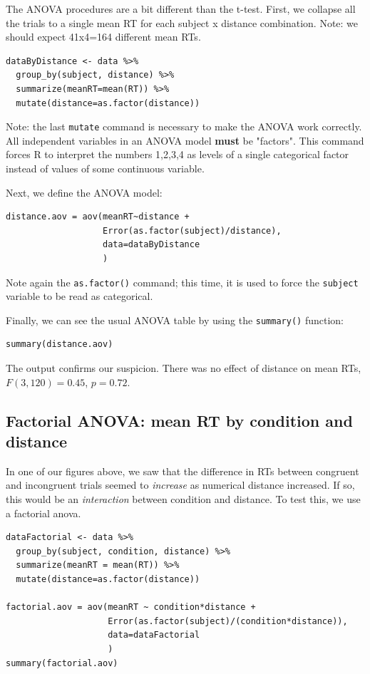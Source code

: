 \documentclass[11pt]{article}
\begin{document}
The ANOVA procedures are a bit different than the t-test.  First, we collapse all the trials to a single mean RT for each subject x distance combination.  Note: we should expect 41x4=164 different mean RTs.

\begin{verbatim}
dataByDistance <- data %>%
  group_by(subject, distance) %>%
  summarize(meanRT=mean(RT)) %>%
  mutate(distance=as.factor(distance))
\end{verbatim}

Note: the last \texttt{mutate} command is necessary to make the ANOVA work correctly.  All independent variables in an ANOVA model \textbf{must} be "factors".  This command forces R to interpret the numbers 1,2,3,4 as levels of a single categorical factor instead of values of some continuous variable.

Next, we define the ANOVA model:

\begin{verbatim}
distance.aov = aov(meanRT~distance + 
                   Error(as.factor(subject)/distance), 
                   data=dataByDistance
                   )
\end{verbatim}

Note again the \texttt{as.factor()} command; this time, it is used to force the \texttt{subject} variable to be read as categorical.  

Finally, we can see the usual ANOVA table by using the \texttt{summary()} function:

\begin{verbatim}
summary(distance.aov)
\end{verbatim}

The output confirms our suspicion.  There was no effect of distance on mean RTs, $F(3,120)=0.45$, $p=0.72$.

\subsection*{Factorial ANOVA: mean RT by condition and distance}
\label{sec-5-3}

In one of our figures above, we saw that the difference in RTs between congruent and incongruent trials seemed to \emph{increase} as numerical distance increased.  If so, this would be an \emph{interaction} between condition and distance.  To test this, we use a factorial anova.

\begin{verbatim}
dataFactorial <- data %>%
  group_by(subject, condition, distance) %>%
  summarize(meanRT = mean(RT)) %>%
  mutate(distance=as.factor(distance))

factorial.aov = aov(meanRT ~ condition*distance + 
                    Error(as.factor(subject)/(condition*distance)), 
                    data=dataFactorial
                    )
summary(factorial.aov)
\end{verbatim}
\end{document}
